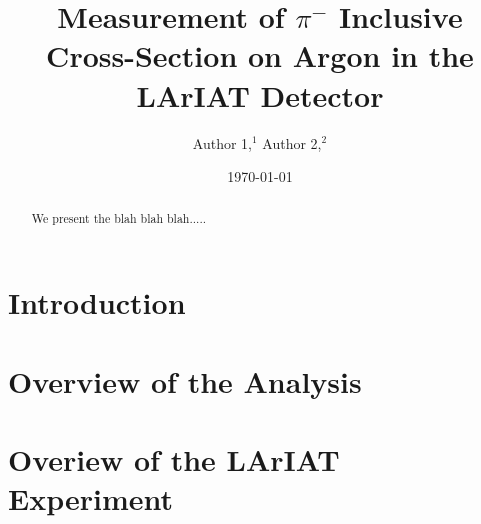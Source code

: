 \documentclass[%
 reprint,
 amsmath,amssymb,
 aps,
]{revtex4-1}
\begin{document}

\title{Measurement of $\pi^{-}$ Inclusive Cross-Section on Argon in the LArIAT Detector}%


\author{Author 1,$^{1}$ Author 2,$^{2}$ \\}



\date{\today}%

\begin{abstract}
We present the blah blah blah.....


\end{abstract}

\maketitle


\section{Introduction}\label{sec:Introduction}


\section{Overview of the Analysis}\label{sec:AnaOverview}


\section{Overiew of the LArIAT Experiment}\label{sec:LArIAT}
\end{document}
